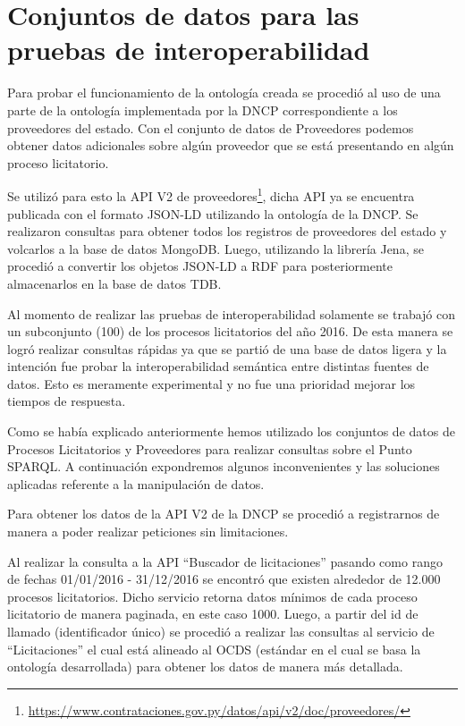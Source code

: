 \section{Conjuntos de datos para las pruebas de interoperabilidad}

Para probar el funcionamiento de la ontología creada se procedió al uso de una parte de la ontología implementada por la DNCP correspondiente a los proveedores del estado. Con el conjunto de datos de Proveedores podemos obtener datos adicionales sobre algún proveedor que se está presentando en algún proceso licitatorio.

Se utilizó para esto la API V2 de proveedores\footnote{\url{https://www.contrataciones.gov.py/datos/api/v2/doc/proveedores/}}, dicha API ya se encuentra publicada con el formato JSON-LD utilizando la ontología de la DNCP. Se realizaron consultas para obtener todos los registros de proveedores del estado y volcarlos a la base de datos MongoDB. Luego, utilizando la librería Jena, se procedió a convertir los objetos JSON-LD a RDF para posteriormente almacenarlos en la base de datos TDB.

Al momento de realizar las pruebas de interoperabilidad solamente se trabajó con un subconjunto (100) de los procesos licitatorios del año 2016. De esta manera se logró realizar consultas rápidas ya que se partió de una base de datos ligera y la intención fue probar la interoperabilidad semántica entre distintas fuentes de datos. Esto es meramente experimental y no fue una prioridad mejorar los tiempos de respuesta.

Como se había explicado anteriormente hemos utilizado los conjuntos de datos de Procesos Licitatorios y Proveedores para realizar consultas sobre el Punto SPARQL. A continuación expondremos algunos inconvenientes y las soluciones aplicadas referente a la manipulación de datos.

Para obtener los datos de la API V2 de la DNCP se procedió a registrarnos de manera a poder realizar peticiones sin limitaciones.

Al realizar la consulta a la API “Buscador de licitaciones” pasando como rango de fechas 01/01/2016 - 31/12/2016 se encontró que existen alrededor de 12.000 procesos licitatorios.
Dicho servicio retorna datos mínimos de cada proceso licitatorio de manera paginada, en este caso 1000. Luego, a partir del id de llamado (identificador único) se procedió a realizar las consultas al servicio de “Licitaciones” el cual está alineado al OCDS (estándar en el cual se basa la ontología desarrollada) para obtener los datos de manera más detallada.

